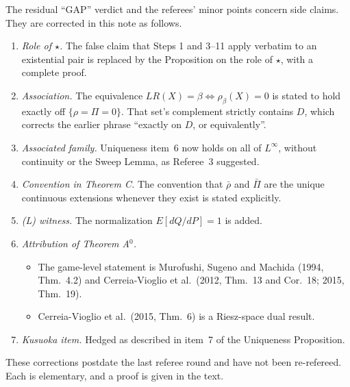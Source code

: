 The residual ``GAP'' verdict and the referees' minor points concern side claims. They are corrected in this note as follows.
\begin{enumerate}
\item \emph{Role of $\star$.} The false claim that Steps 1 and 3--11 apply verbatim to an existential pair is replaced by the Proposition on the role of $\star$, with a complete proof.
\item \emph{Association.} The equivalence $LR(X)=\beta\iff\rho_\beta(X)=0$ is stated to hold exactly off $\{\rho=\Pi=0\}$. That set's complement strictly contains $D$, which corrects the earlier phrase ``exactly on $D$, or equivalently''.
\item \emph{Associated family.} Uniqueness item~6 now holds on all of $L^\infty$, without continuity or the Sweep Lemma, as Referee~3 suggested.
\item \emph{Convention in Theorem C.} The convention that $\bar\rho$ and $\bar\Pi$ are the unique continuous extensions whenever they exist is stated explicitly.
\item \emph{(L) witness.} The normalization $E[dQ/dP]=1$ is added.
\item \emph{Attribution of Theorem A$^0$.}
  \begin{itemize}
  \item The game-level statement is Murofushi, Sugeno and Machida (1994, Thm.~4.2) and Cerreia-Vioglio et al.\ (2012, Thm.~13 and Cor.~18; 2015, Thm.~19).
  \item Cerreia-Vioglio et al.\ (2015, Thm.~6) is a Riesz-space dual result.
  \end{itemize}
\item \emph{Kusuoka item.} Hedged as described in item~7 of the Uniqueness Proposition.
\end{enumerate}
These corrections postdate the last referee round and have not been re-refereed. Each is elementary, and a proof is given in the text.

